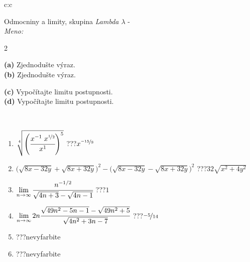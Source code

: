 \documentclass[10pt]{report}
\begin{document}
\begin{tabular}{c:c}
\begin{minipage}[c][104.5mm][t]{0.5\linewidth}
\begin{center}
\vspace{7mm}
{\huge Odmocniny a limity, skupina \textit{Lambda $\lambda$} -}\\[5mm]
\textit{Meno:}\phantom{xxxxxxxxxxxxxxxxxxxxxxxxxxxxxxxxxxxxxxxxxxxxxxxxxxxxxxxxxxxxxxxxx}\\[5mm]
\begin{minipage}{0.95\linewidth}
\begin{center}
{\small \begin{multicols}{2} \raggedright
\textbf{(a)} Zjednodušte výraz. \\[1mm]
\textbf{(b)} Zjednodušte výraz. \par \columnbreak
\textbf{(c)} Vypočítajte limitu postupnosti. \\[1mm]
\textbf{(d)} Vypočítajte limitu postupnosti.
\end{multicols}
}
\end{center}
\end{minipage}
\\[4mm]
\begin{minipage}{0.79\linewidth}
\begin{center}
\begin{varwidth}{\linewidth}
\begin{enumerate}
\small
\item $\sqrt[4]{\left(\cfrac{x^{-1}\;x^{\nicefrac{1}{2}}}{x^{1}}\right)^{5}}$\quad \dotfill\; ???\;\dotfill \quad $x^{\nicefrac{-15}{8}}$
\item {\footnotesize{\scriptsize$\big(\sqrt{8x-32y}+\sqrt{8x+32y}\big)^2-\big(\sqrt{8x-32y}-\sqrt{8x+32y}\big)^2$}\quad \dotfill\; ???\;\dotfill \quad $32\sqrt{x^2+4y^2}$}
\item $\lim\limits_{n\to\infty}\cfrac{n^{-1/2}}{\sqrt{4n+3}-\sqrt{4n-1}}$\quad \dotfill\; ???\;\dotfill \quad $1$
\item $\lim\limits_{n\to\infty}2n\cfrac{\sqrt{49n^2-5n-1}-\sqrt{49n^2+5}}{\sqrt{4n^2+3n-7}}$\quad \dotfill\; ???\;\dotfill \quad $\nicefrac{-5}{14}$
\item \quad \dotfill\; ???\;\dotfill \quad nevyfarbite
\item \quad \dotfill\; ???\;\dotfill \quad nevyfarbite
\end{enumerate}
\end{varwidth}
\end{center}
\end{minipage}

\end{center}
\end{minipage}
\end{tabular}
\end{document}
